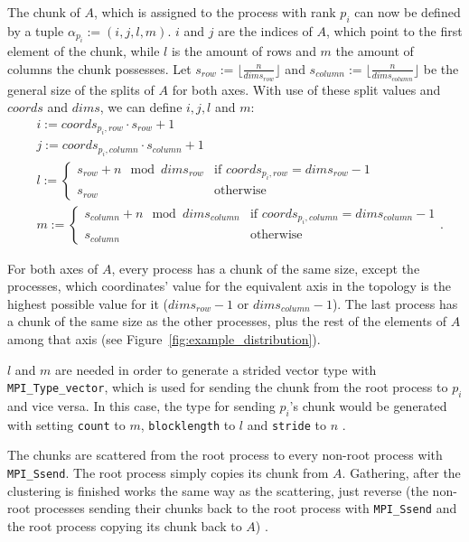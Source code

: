 \documentclass[twoside,11pt]{article}
\begin{document}
The chunk of $A$, which is assigned to the process with
rank $p_i$ can now be defined by a tuple
$\alpha_{p_i} := (i, j, l, m)$.
$i$ and $j$ are the indices of $A$, which point to the
first element of the chunk, while $l$ is the amount of rows
and $m$ the amount of columns the chunk possesses.
Let $s_{row} := \lfloor \frac{n}{dims_{row}} \rfloor$ and
$s_{column} := \lfloor \frac{n}{dims_{column}} \rfloor$ be
the general size of the splits of $A$ for both axes.
With use of these split values and $coords$ and $dims$, we
can define $i, j, l$ and $m$:
\begin{align*}
  &i := coords_{p_i,row} \cdot s_{row} + 1 \\
  &j := coords_{p_i, column} \cdot s_{column} + 1 \\
  &l := \begin{cases}
    s_{row} + n \mod dims_{row} &\text{if } coords_{p_i, row} = dims_{row} - 1 \\
    s_{row} &\text{otherwise}
  \end{cases} \\
  &m := \begin{cases}
    s_{column} + n \mod dims_{column} &\text{if } coords_{p_i, column} = dims_{column} - 1 \\
    s_{column} &\text{otherwise}
  \end{cases}.
\end{align*}

For both axes of $A$, every process has a chunk of the same
size, except the processes, which coordinates' value for
the equivalent axis in the topology is the highest possible
value for it ($dims_{row} - 1$ or $dims_{column} - 1$).
The last process has a chunk of the same size as the other
processes, plus the rest of the elements of $A$ among that
axis (see Figure~\ref{fig:example_distribution}).

$l$ and $m$ are needed in order to generate a strided
vector type with \texttt{MPI\_Type\_vector}, which is used
for sending the chunk from the root process to $p_i$ and
vice versa.
In this case, the type for sending $p_i$'s chunk would be
generated with setting \texttt{count} to $m$,
\texttt{blocklength} to $l$ and \texttt{stride} to $n$
\citep[see][Chapter 4]{mpi}.

The chunks are scattered from the root process to every
non-root process with \texttt{MPI\_S\-send}.
The root process simply copies its chunk from $A$.
Gathering, after the clustering is finished works the same
way as the scattering, just reverse (the non-root processes
sending their chunks back to the root process with
\texttt{MPI\_Ssend} and the root process copying its chunk
back to $A$) \citep[see Algorithm~\ref{alg:perc_par},
lines 5,7 and][Chapter 3]{mpi}.
\end{document}

